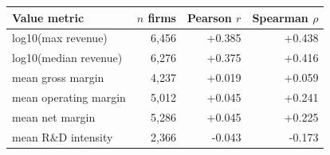 \begin{tabular}{lrrr}
\toprule
Value metric & $n$ firms & Pearson $r$ & Spearman $\rho$ \\
\midrule
log10(max revenue) & 6,456 & +0.385 & +0.438 \\
log10(median revenue) & 6,276 & +0.375 & +0.416 \\
mean gross margin & 4,237 & +0.019 & +0.059 \\
mean operating margin & 5,012 & +0.045 & +0.241 \\
mean net margin & 5,286 & +0.045 & +0.225 \\
mean R\&D intensity & 2,366 & -0.043 & -0.173 \\
\bottomrule
\end{tabular}